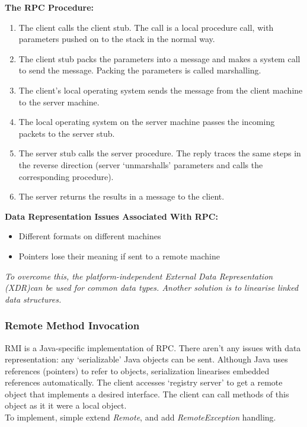 \documentclass[a4paper,oneside]{report}
\begin{document}
		\noindent \textbf{The RPC Procedure:}
		\begin{enumerate}
			\item The client calls the client stub. The call is a local procedure call, with parameters pushed on to the stack in the normal way.
			\item The client stub packs the parameters into a message and makes a system call to send the message. Packing the parameters is called marshalling.
			\item The client's local operating system sends the message from the client machine to the server machine.
			\item The local operating system on the server machine passes the incoming packets to the server stub.
			\item The server stub calls the server procedure. The reply traces the same steps in the reverse direction (server `unmarshalls' parameters and calls the corresponding procedure).
			\item The server returns the results in a message to the client.
		\end{enumerate}
		
		\noindent \textbf{Data Representation Issues Associated With RPC:}
		\begin{itemize}
			\item Different formats on different machines
			\item Pointers lose their meaning if sent to a remote machine
		\end{itemize}
		
		\emph{To overcome this, the platform-independent External Data Representation (XDR)can be used for common data types. Another solution is to linearise linked data structures.}
  	
  		\subsubsection{Remote Method Invocation}
  		RMI is a Java-specific implementation of RPC. There aren't any issues with data representation: any `serializable' Java objects can be sent. Although Java uses references (pointers) to refer to objects, serialization linearises embedded references automatically. The client accesses `registry server' to get a remote object that implements a desired interface. The client can call methods of this object as it it were a local object.\\
  		
  		\noindent To implement, simple extend \emph{Remote}, and add \emph{RemoteException} handling.
  		
\end{document}
